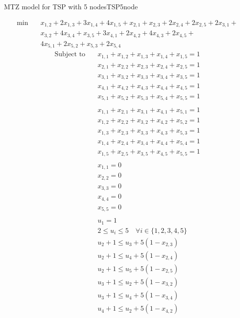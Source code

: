 \begin{example}{MTZ model for TSP with 5 nodes}{TSP5node}

\begin{align*}\min\quad & x_{1,2} + 2 x_{1,3} + 3 x_{1,4} + 4 x_{1,5} + x_{2,1} + x_{2,3} + 2 x_{2,4} + 2 x_{2,5} + 2 x_{3,1} + \\&x_{3,2} + 4 x_{3,4} + x_{3,5} + 3 x_{4,1} + 2 x_{4,2} + 4 x_{4,3} + 2 x_{4,5} + \\&4 x_{5,1} + 2 x_{5,2} + x_{5,3} + 2 x_{5,4}
\end{align*}
\begin{align*}
\text{Subject to} \quad  
 & x_{1,1} + x_{1,2} + x_{1,3} + x_{1,4} + x_{1,5} = 1\\
 & x_{2,1} + x_{2,2} + x_{2,3} + x_{2,4} + x_{2,5} = 1\\
 & x_{3,1} + x_{3,2} + x_{3,3} + x_{3,4} + x_{3,5} = 1\\
 & x_{4,1} + x_{4,2} + x_{4,3} + x_{4,4} + x_{4,5} = 1\\
 & x_{5,1} + x_{5,2} + x_{5,3} + x_{5,4} + x_{5,5} = 1\\
 \\
&x_{1,1} + x_{2,1} + x_{3,1} + x_{4,1} + x_{5,1} = 1\\
 & x_{1,2} + x_{2,2} + x_{3,2} + x_{4,2} + x_{5,2} = 1\\
 & x_{1,3} + x_{2,3} + x_{3,3} + x_{4,3} + x_{5,3} = 1\\
 & x_{1,4} + x_{2,4} + x_{3,4} + x_{4,4} + x_{5,4} = 1\\
 & x_{1,5} + x_{2,5} + x_{3,5} + x_{4,5} + x_{5,5} = 1\\
\\
 & x_{1,1} = 0\\
 & x_{2,2} = 0\\
 & x_{3,3} = 0\\
 & x_{4,4} = 0\\
 & x_{5,5} = 0\\
 \\
 & u_{1} = 1\\
 & 2 \leq u_{i} \leq 5 \quad\forall i \in \{1,2,3,4,5\}\\
 & u_{2} +1 \leq u_{3} + 5 (1-x_{2,3})\\
 & u_{2} +1 \leq u_{4} + 5  (1-x_{2,4})\\
  & u_{2} +1 \leq  u_{5} + 5 (1-x_{2,5} )\\
 & u_{3} +1 \leq u_{2} + 5  (1-x_{3,2})\\
 & u_{3} +1 \leq u_{4} + 5  (1-x_{3,4})\\
 & u_{4} +1 \leq u_{2} + 5  (1-x_{4,2})\\

\end{align*}
\end{example}
